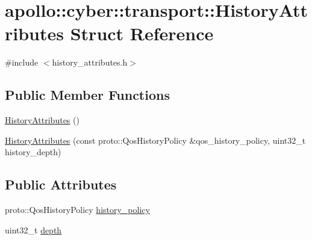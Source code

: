 \hypertarget{structapollo_1_1cyber_1_1transport_1_1HistoryAttributes}{\section{apollo\-:\-:cyber\-:\-:transport\-:\-:History\-Attributes Struct Reference}
\label{structapollo_1_1cyber_1_1transport_1_1HistoryAttributes}
}


{\ttfamily \#include $<$history\-\_\-attributes.\-h$>$}

\subsection*{Public Member Functions}
\begin{DoxyCompactItemize}
\item 
\hyperlink{structapollo_1_1cyber_1_1transport_1_1HistoryAttributes_a431efe2017d6f1aba975a0ec14905161}{History\-Attributes} ()
\item 
\hyperlink{structapollo_1_1cyber_1_1transport_1_1HistoryAttributes_ab391074c6adf21ac9404e084934c8063}{History\-Attributes} (const proto\-::\-Qos\-History\-Policy \&qos\-\_\-history\-\_\-policy, uint32\-\_\-t history\-\_\-depth)
\end{DoxyCompactItemize}
\subsection*{Public Attributes}
\begin{DoxyCompactItemize}
\item 
proto\-::\-Qos\-History\-Policy \hyperlink{structapollo_1_1cyber_1_1transport_1_1HistoryAttributes_ad5b9c8f33bf4b55830eace547e39b8eb}{history\-\_\-policy}
\item 
uint32\-\_\-t \hyperlink{structapollo_1_1cyber_1_1transport_1_1HistoryAttributes_ab414b595e3a7f637657b854c36b3cfa9}{depth}
\end{DoxyCompactItemize}


